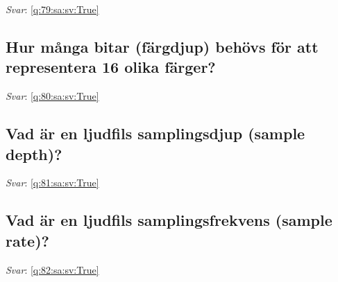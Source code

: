 \documentclass[a4paper,11pt,oneside]{article}
\begin{document}
\begin{sloppypar}
\label{q:79:sa:sv:False}

\vspace{2cm}

\noindent\makebox[\textwidth]{\hrulefill}

\vspace{1cm}

\textit{Svar}: \autoref{q:79:sa:sv:True}



\subsection{Hur m\r{a}nga bitar (f\"argdjup) beh\"ovs f\"or att representera 16 olika f\"arger?}

\label{q:80:sa:sv:False}

\vspace{2cm}

\noindent\makebox[\textwidth]{\hrulefill}

\vspace{1cm}

\textit{Svar}: \autoref{q:80:sa:sv:True}



\subsection{Vad \"ar en ljudfils samplingsdjup (sample depth)?}

\label{q:81:sa:sv:False}

\vspace{2cm}

\noindent\makebox[\textwidth]{\hrulefill}

\vspace{1cm}

\textit{Svar}: \autoref{q:81:sa:sv:True}



\subsection{Vad \"ar en ljudfils samplingsfrekvens (sample rate)?}

\label{q:82:sa:sv:False}

\vspace{2cm}

\noindent\makebox[\textwidth]{\hrulefill}

\vspace{1cm}

\textit{Svar}: \autoref{q:82:sa:sv:True}




\end{sloppypar}
\end{document}
